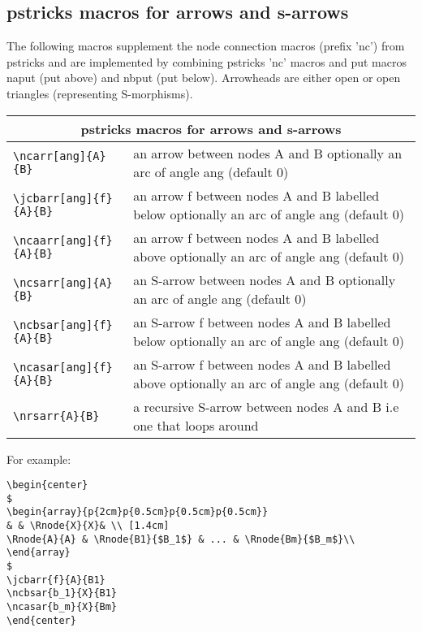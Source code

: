 \documentclass[10pt,a4paper]{article}
\begin{document}
\subsection {pstricks macros for arrows and s-arrows}
The following macros supplement the node connection macros (prefix 'nc') from pstricks and are implemented by combining pstricks 'nc' macros and put macros naput (put above) and nbput (put below). Arrowheads are either open or open triangles (representing S-morphisms). \\
		\begin{tabular}{|l |  p{5cm} | }
		\multicolumn{2}{|c|}{pstricks macros for arrows and s-arrows} \\
		   \hline	   
		   \verb!\ncarr[ang]{A}{B}! &  an arrow between nodes A and B optionally an arc of angle ang (default 0)\\
		   \hline
		 	 \verb!\jcbarr[ang]{f}{A}{B}! & an arrow f between nodes A and B labelled below optionally an arc of angle ang (default 0)\\
		 	 \hline
		 	 \verb!\ncaarr[ang]{f}{A}{B}! & an arrow f between nodes A and B labelled above optionally an arc of angle ang (default 0)\\
			\hline	   
		   \verb!\ncsarr[ang]{A}{B}! &  an S-arrow between nodes A and B optionally an arc of angle ang (default 0)\\
		 	 \hline			
		 	 \verb!\ncbsar[ang]{f}{A}{B}! & an S-arrow f between nodes A and B labelled below optionally an arc of angle ang (default 0)\\
		 	 \hline
		 	 \verb!\ncasar[ang]{f}{A}{B}! & an S-arrow f between nodes A and B labelled above optionally an arc of angle ang (default 0)\\
		 	 \hline	   
		   \verb!\nrsarr{A}{B}! &  a recursive S-arrow between nodes A and B i.e one that loops around\\ 
			\hline		
		\end{tabular}
\vspace{0.5cm}

\noindent For example:
\begin{verbatim}
\begin{center}
$
\begin{array}{p{2cm}p{0.5cm}p{0.5cm}p{0.5cm}}
& & \Rnode{X}{X}& \\ [1.4cm]
\Rnode{A}{A} & \Rnode{B1}{$B_1$} & ... & \Rnode{Bm}{$B_m$}\\
\end{array}
$
\jcbarr{f}{A}{B1}
\ncbsar{b_1}{X}{B1}
\ncasar{b_m}{X}{Bm}
\end{center}
\end{verbatim}
\end{document}
